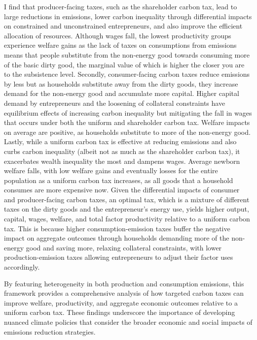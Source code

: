 \documentclass[12pt,a4paper]{article}
\begin{document}
\hspace*{6mm} I find that producer-facing taxes, such as the shareholder carbon tax, lead to large reductions in emissions, lower carbon inequality through differential impacts on constrained and unconstrained entrepreneurs, and also improve the efficient allocation of resources. Although wages fall, the lowest productivity groups experience welfare gains as the lack of taxes on consumptions from emissions means that people substitute from the non-energy good towards consuming more of the basic dirty good, the marginal value of which is higher the closer you are to the subsistence level. Secondly, consumer-facing carbon taxes reduce emissions by less but as households substitute away from the dirty goods, they increase demand for the non-energy good and accumulate more capital. Higher capital demand by entrepreneurs and the loosening of collateral constraints have equilibrium effects of increasing carbon inequality but mitigating the fall in wages that occurs under both the uniform and shareholder carbon tax. Welfare impacts on average are positive, as households substitute to more of the non-energy good. Lastly, while a uniform carbon tax is effective at reducing emissions and also curbs carbon inequality (albeit not as much as the shareholder carbon tax), it exacerbates wealth inequality the most and dampens wages. Average newborn welfare falls, with low welfare gains and eventually losses for the entire population as a uniform carbon tax increases, as all goods that a household consumes are more expensive now. Given the differential impacts of consumer and producer-facing carbon taxes, an optimal tax, which is a mixture of different taxes on the dirty goods and the entrepreneur's energy use, yields higher output, capital, wages, welfare, and total factor productivity relative to a uniform carbon tax. This is because higher consumption-emission taxes buffer the negative impact on aggregate outcomes through households demanding more of the non-energy good and saving more, relaxing collateral constraints, with lower production-emission taxes allowing entrepreneurs to adjust their factor uses accordingly.

\hspace*{6mm} By featuring heterogeneity in both production and consumption emissions, this framework provides a comprehensive analysis of how targeted carbon taxes can improve welfare, productivity, and aggregate economic outcomes relative to a uniform carbon tax. These findings underscore the importance of developing nuanced climate policies that consider the broader economic and social impacts of emissions reduction strategies. 
\end{document}
